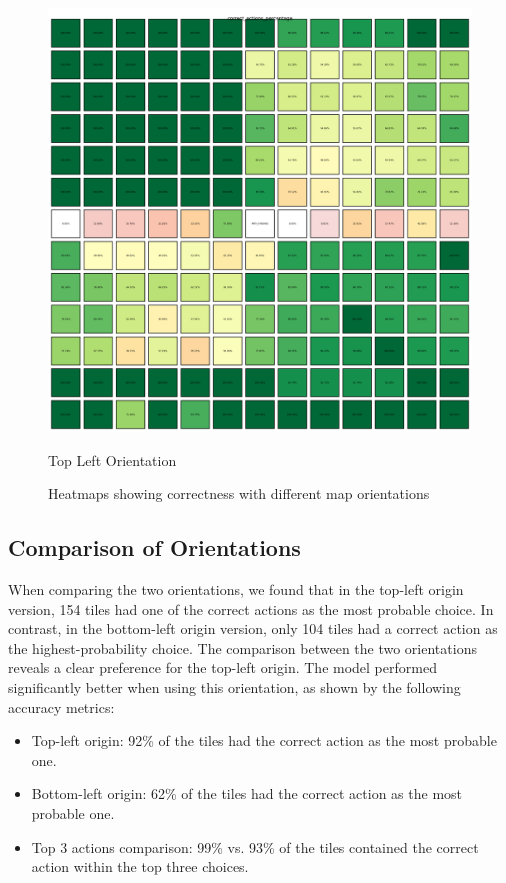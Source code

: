 \begin{figure}[h]
\begin{minipage}[b]{0.45\textwidth}
    \includegraphics[width=\textwidth]{
      images/results_discussion/correctness_hm_TL.png
    }
    \caption{Top Left Orientation}
    \label{fig:heatmapTL}
  \end{minipage}
  \caption{Heatmaps showing correctness with different map orientations}
  \label{fig:orientation_correctness}
\end{figure}

\subsection{Comparison of Orientations}

When comparing the two orientations, we found that in the top-left origin
version, 154 tiles had one of the correct actions as the most probable choice.
In contrast, in the bottom-left origin version, only 104 tiles had a correct
action as the highest-probability choice. The comparison between the two orientations
reveals a clear preference for the top-left origin. The model performed
significantly better when using this orientation, as shown by the following accuracy
metrics:
\begin{itemize}
  \item Top-left origin: 92\% of the tiles had the correct action as the most probable
    one.

  \item Bottom-left origin: 62\% of the tiles had the correct action as the most
    probable one.

  \item Top 3 actions comparison: 99\% vs. 93\% of the tiles contained the correct
    action within the top three choices.
\end{itemize}

